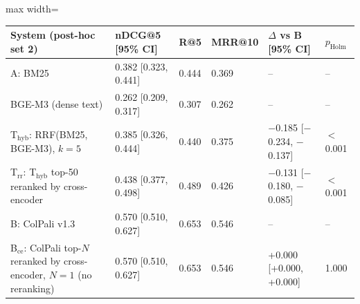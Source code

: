\begin{adjustbox}{max width=\linewidth}
\begin{tabular}{llllll}
\toprule
System (post-hoc set 2) & nDCG@5 [95\% CI] & R@5 & MRR@10 & $\Delta$ vs B [95\% CI] & $p_\mathrm{Holm}$ \\
\midrule
A: BM25 & 0.382 [0.323, 0.441] & 0.444 & 0.369 & -- & -- \\
BGE-M3 (dense text) & 0.262 [0.209, 0.317] & 0.307 & 0.262 & -- & -- \\
T$_\text{hyb}$: RRF(BM25, BGE-M3), $k{=}5$ & 0.385 [0.326, 0.444] & 0.440 & 0.375 & $-$0.185 [$-$0.234, $-$0.137] & $<$0.001 \\
T$_\text{rr}$: T$_\text{hyb}$ top-50 reranked by cross-encoder & 0.438 [0.377, 0.498] & 0.489 & 0.426 & $-$0.131 [$-$0.180, $-$0.085] & $<$0.001 \\
B: ColPali v1.3 & 0.570 [0.510, 0.627] & 0.653 & 0.546 & -- & -- \\
B$_\text{ce}$: ColPali top-$N$ reranked by cross-encoder, $N{=}1$ (no reranking) & 0.570 [0.510, 0.627] & 0.653 & 0.546 & +0.000 [+0.000, +0.000] & 1.000 \\
\bottomrule
\end{tabular}
\end{adjustbox}
\par{}
